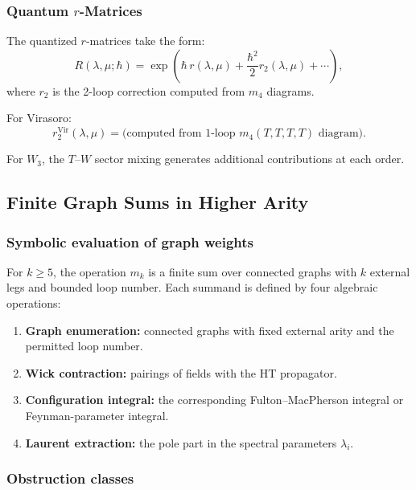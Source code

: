 \subsubsection{Quantum $r$-Matrices}

The quantized $r$-matrices take the form:
\begin{equation}
R(\lambda,\mu; \hbar) = \exp\left( \hbar \, r(\lambda,\mu) + \frac{\hbar^2}{2} r_2(\lambda,\mu) + \cdots \right),
\end{equation}
where $r_2$ is the 2-loop correction computed from $m_4$ diagrams.

For Virasoro:
\begin{equation}
r_2^{\text{Vir}}(\lambda,\mu) = \text{(computed from 1-loop } m_4(T,T,T,T) \text{ diagram)}.
\end{equation}

For $W_3$, the $T$--$W$ sector mixing generates additional contributions at each order.

\subsection{Finite Graph Sums in Higher Arity}

\subsubsection{Symbolic evaluation of graph weights}

For $k\geq5$, the operation $m_k$ is a finite sum over connected
graphs with $k$ external legs and bounded loop number. Each summand is
defined by four algebraic operations:
\begin{enumerate}
\item \textbf{Graph enumeration:} connected graphs with fixed external
arity and the permitted loop number.
\item \textbf{Wick contraction:} pairings of fields with the HT
propagator.
\item \textbf{Configuration integral:} the corresponding
Fulton--MacPherson integral or Feynman-parameter integral.
\item \textbf{Laurent extraction:} the pole part in the spectral
parameters $\lambda_i$.
\end{enumerate}

\subsubsection{Obstruction classes}

